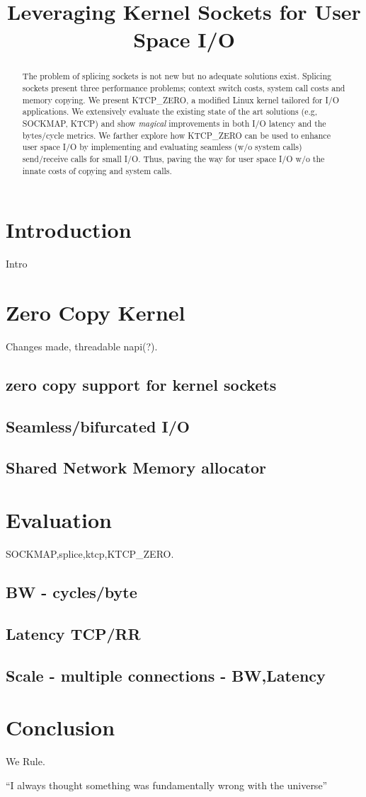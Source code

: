 \documentclass[newfonts=false,format=sigconf,9pt,letterpaper]{acmart}
\title{Leveraging Kernel Sockets for User Space I/O}
\newcommand{\oursys}{KTCP\_ZERO\xspace}
\begin{document}
\begin{abstract}
    The problem of splicing sockets is not new but no adequate solutions exist. Splicing sockets present three performance problems; context switch costs, system call costs and memory copying. We present \oursys, a modified Linux kernel tailored for I/O applications. We extensively evaluate the existing state of the art solutions (e.g, SOCKMAP, KTCP) and show \emph{magical} improvements in both I/O latency and the bytes/cycle metrics. We farther explore how \oursys can be used to enhance user space I/O by implementing and evaluating seamless (w/o system calls) send/receive calls for small I/O. Thus, paving the way for user space I/O w/o the innate costs of copying and system calls.
\end{abstract}

\maketitle
\sloppypar

\section{Introduction}
Intro
\section{Zero Copy Kernel}
Changes made, threadable napi(?).
\subsection{zero copy support for kernel sockets}
\subsection{Seamless/bifurcated I/O}
\subsection{Shared Network Memory allocator}
\section{Evaluation}
SOCKMAP,splice,ktcp,\oursys.
\subsection{BW - cycles/byte}
\subsection{Latency TCP/RR}
\subsection{Scale - multiple connections - BW,Latency}
\section{Conclusion}
We Rule.

``I always thought something was fundamentally wrong with the universe'' \citep{adams1995hitchhiker}



\end{document}
